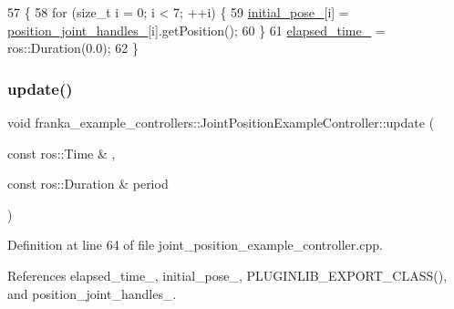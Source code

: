 \begin{DoxyCode}
57                                                               \{
58   \textcolor{keywordflow}{for} (\textcolor{keywordtype}{size\_t} i = 0; i < 7; ++i) \{
59     \hyperlink{classfranka__example__controllers_1_1JointPositionExampleController_aec370794d28554126ba021f10c8216ce}{initial\_pose\_}[i] = \hyperlink{classfranka__example__controllers_1_1JointPositionExampleController_acaa5902db27586e01e48939526e27e5a}{position\_joint\_handles\_}[i].getPosition();
60   \}
61   \hyperlink{classfranka__example__controllers_1_1JointPositionExampleController_acdbb7dc1611653a0c6bed1d94dc0c979}{elapsed\_time\_} = ros::Duration(0.0);
62 \}
\end{DoxyCode}
\mbox{\label{classfranka__example__controllers_1_1JointPositionExampleController_a3475db8f06dde9e37fd03660ef4d1cb0}} 
\subsubsection{\texorpdfstring{update()}{update()}}
{\footnotesize\ttfamily void franka\+\_\+example\+\_\+controllers\+::\+Joint\+Position\+Example\+Controller\+::update (\begin{DoxyParamCaption}\item[{const ros\+::\+Time \&}]{,  }\item[{const ros\+::\+Duration \&}]{period }\end{DoxyParamCaption})\hspace{0.3cm}{\ttfamily [override]}}



Definition at line 64 of file joint\+\_\+position\+\_\+example\+\_\+controller.\+cpp.



References elapsed\+\_\+time\+\_\+, initial\+\_\+pose\+\_\+, P\+L\+U\+G\+I\+N\+L\+I\+B\+\_\+\+E\+X\+P\+O\+R\+T\+\_\+\+C\+L\+A\+S\+S(), and position\+\_\+joint\+\_\+handles\+\_\+.


